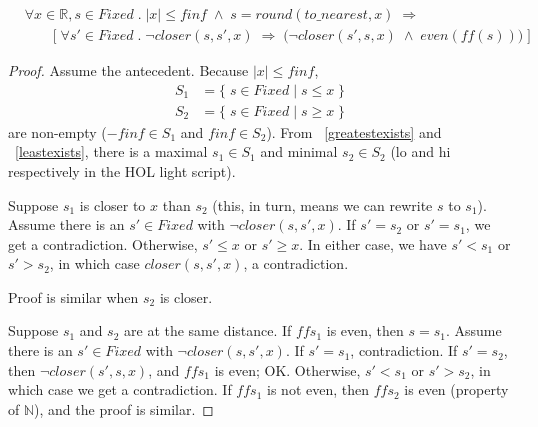 \documentclass{article}
\begin{document}
\begin{thm}
\label{rndnearisnear}
\begin{align*}
&\forall x \in \mathbb{R}, s \in Fixed \; . \; |x| \leq finf \; \wedge \;
s = round(to\_nearest, x) \; \Longrightarrow \\
&\qquad \Big [ \; \forall s' \in Fixed \; . \; \neg closer(s, s', x) \; 
\Longrightarrow
\; \big(\neg closer(s', s, x) \; \wedge \; even(ff(s)) \big) \; \Big ]
\end{align*}
\begin{proof} Assume the antecedent. Because $|x| \leq finf$,
\begin{align*}
S_1 &= \{ \; s \in Fixed \; | \; s \leq x \; \}\\
S_2 &= \{ \; s \in Fixed \; | \; s \geq x \; \}
\end{align*}
are non-empty ($-finf \in S_1$ and $finf \in S_2$). From ~\ref{greatestexists}
and ~\ref{leastexists}, there is a maximal $s_1 \in S_1$ and minimal $s_2 \in 
S_2$ (lo and hi respectively in the HOL light script).

Suppose $s_1$ is closer to $x$ than $s_2$ (this, in turn, means we can rewrite
$s$ to $s_1$). Assume there is an $s' \in Fixed$ with $\neg closer(s, s', x)$.
If $s' = s_2$ or $s' = s_1$, we get a contradiction. Otherwise, $s' \leq x$
or $s' \geq x$. In either case, we have $s' < s_1$ or $s' > s_2$, in which case
$closer(s, s', x)$, a contradiction.

Proof is similar when $s_2$ is closer.

Suppose $s_1$ and $s_2$ are at the same distance. If $ff s_1$ is even, then
$s = s_1$. Assume there is an $s' \in Fixed$ with $\neg closer(s, s', x)$.
If $s' = s_1$, contradiction. If $s' = s_2$, then $\neg closer(s', s, x)$,
and $ff s_1$ is even; OK. Otherwise, $s' < s_1$ or $s' > s_2$, in which case
we get a contradiction. If $ff s_1$ is not even, then $ff s_2$ is even
(property of $\mathbb{N}$), and the proof is similar.
\end{proof}
\end{thm}
\end{document}
